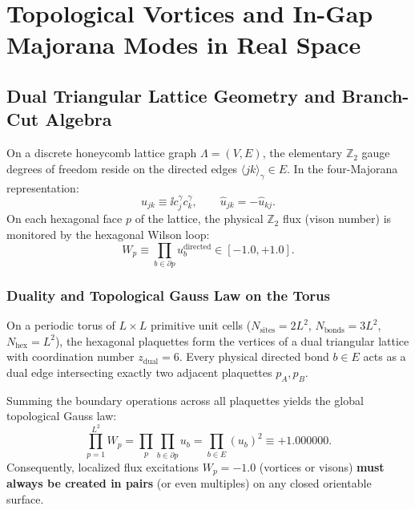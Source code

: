 
\chapter{Topological Vortices and In-Gap Majorana Modes in Real Space}
\label{ch:vortices_real_lattice}

\section{Dual Triangular Lattice Geometry and Branch-Cut Algebra}
\label{sec:vortex_geometry}

On a discrete honeycomb lattice graph $\Lambda = (V, E)$, the elementary $\mathbb{Z}_2$ gauge degrees of freedom reside on the directed edges $\langle j k \rangle_\gamma \in E$. In the four-Majorana representation:
\begin{equation}
\label{eq:gauge_link_operator}
\hat{u}_{jk} \equiv \ii c_j^\gamma c_k^\gamma, \qquad \hat{u}_{jk} = -\hat{u}_{kj}.
\end{equation}
On each hexagonal face $p$ of the lattice, the physical $\mathbb{Z}_2$ flux (vison number) is monitored by the hexagonal Wilson loop:
\begin{equation}
\label{eq:hexagonal_wilson_loop}
W_p \equiv \prod_{b \in \partial p} u_b^{\mathrm{directed}} \in [-1.0, +1.0].
\end{equation}

\subsection{Duality and Topological Gauss Law on the Torus}
On a periodic torus of $L \times L$ primitive unit cells ($N_{\mathrm{sites}} = 2L^2$, $N_{\mathrm{bonds}} = 3L^2$, $N_{\mathrm{hex}} = L^2$), the hexagonal plaquettes form the vertices of a dual triangular lattice with coordination number $z_{\mathrm{dual}} = 6$. Every physical directed bond $b \in E$ acts as a dual edge intersecting exactly two adjacent plaquettes $p_A, p_B$. 

Summing the boundary operations across all plaquettes yields the global topological Gauss law:
\begin{equation}
\label{eq:torus_gauss_law}
\prod_{p=1}^{L^2} W_p = \prod_{p} \prod_{b \in \partial p} u_b = \prod_{b \in E} (u_b)^2 \equiv +1.000000.
\end{equation}
Consequently, localized flux excitations $W_p = -1.0$ (vortices or visons) \textbf{must always be created in pairs} (or even multiples) on any closed orientable surface.


